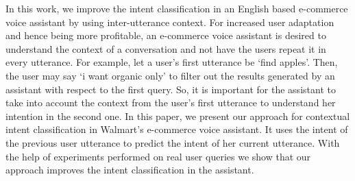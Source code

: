 In this work, we improve the intent classification in an English based e-commerce voice assistant by using inter-utterance context. For increased user adaptation and hence being more profitable, an e-commerce voice assistant is desired to understand the context of a conversation and not have the users repeat it in every utterance. For example, let a user's first utterance be ‘find apples'. Then, the user may say ‘i want organic only' to filter out the results generated by an assistant with respect to the first query. So, it is important for the assistant to take into account the context from the user's first utterance to understand her intention in the second one. In this paper, we present our approach for contextual intent classification in Walmart's e-commerce voice assistant. It uses the intent of the previous user utterance to predict the intent of her current utterance. With the help of experiments performed on real user queries we show that our approach improves the intent classification in the assistant.
